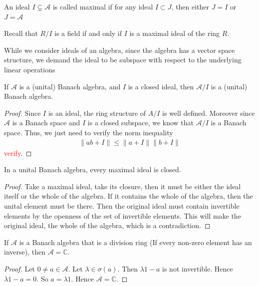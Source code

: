 

\begin{definition}
  An ideal $I \subsetneq \mathcal{A}$ is called maximal if for any
  ideal $I \subset J$, then either $J = I$ or $J = \mathcal{A}$
\end{definition}

\begin{proposition}
  Recall that $R/I$ is a field if and only if $I$ is a
  maximal ideal of the ring $R$.
\end{proposition}

\begin{remark}
  While we consider ideals of an algebra, since the algebra has a
  vector space structure, we demand the ideal to be subspace with
  respect to the underlying linear operations
\end{remark}

\begin{lemma}
  If $\mathcal{A}$ is a (unital) Banach algebra, and $I$ is a closed
  ideal, then $\mathcal{A}/I$ is a (unital) Banach algebra.
\end{lemma}
\begin{proof}
  Since $I$ is an ideal, the ring structure of $A/I$ is well defined.
  Moreover since $\mathcal{A}$ is a Banach space and $I$ is a closed
  subspace, we know that $\mathcal{A}/I$ is a Banach space. Thus, we
  just need to verify the norm inequality
  \begin{align*}
    \|ab + I\| \le \|a + I\|\|b + I\|
  \end{align*} \textcolor{red}{verify}.
\end{proof}

\begin{lemma}
  In a unital Banach algebra, every maximal ideal is closed.
\end{lemma}
\begin{proof}
  Take a maximal ideal, take its closure, then it must be either the
  ideal itself or the whole of the algebra. If it contains the whole
  of the algebra, then the unital element must be there. Then the
  original ideal must contain invertible elements by the openness of
  the set of invertible elements. This will make the original ideal,
  the whole of the algebra, which is a contradiction.
\end{proof}

\begin{lemma}
  If $\mathcal{A}$ is a Banach algebra that is a division ring (If
  every non-zero element has an inverse), then
  $\mathcal{A} = \mathbb{C}$.
  \label{2:A=C}
\end{lemma}
\begin{proof}
  Let $0 \neq a \in \mathcal{A}$. Let $\lambda \in \sigma(a)$. Then
  $\lambda1 - a$ is not invertible. Hence $\lambda1 - a = 0$. So $a =
  \lambda 1$. Hence $\mathcal{A} = \mathbb{C}$.
\end{proof}

